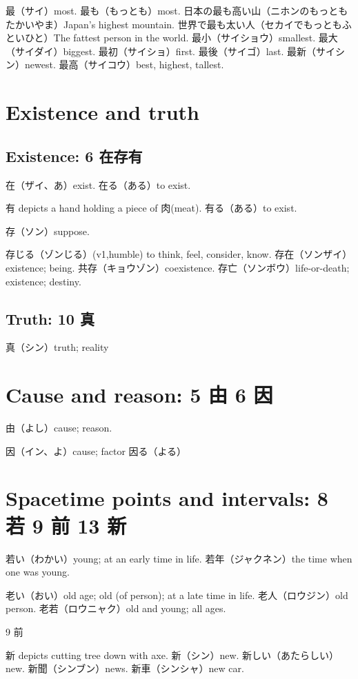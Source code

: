 最（サイ）most.
最も（もっとも）most.
日本の最も高い山（ニホンのもっともたかいやま）Japan's highest mountain.
世界で最も太い人（セカイでもっともふといひと）The fattest person in the world.
最小（サイショウ）smallest.
最大（サイダイ）biggest.
最初（サイショ）first.
最後（サイゴ）last.
最新（サイシン）newest.
最高（サイコウ）best, highest, tallest.

\section{Existence and truth}

\subsection{Existence: 6 在存有}

在（ザイ、あ）exist.
在る（ある）to exist.

有 depicts a hand holding a piece of 肉(meat).
有る（ある）to exist.

存（ソン）suppose.

存じる（ゾンじる）(v1,humble) to think, feel, consider, know.
存在（ソンザイ）existence; being.
共存（キョウゾン）coexistence.
存亡（ソンボウ）life-or-death; existence; destiny.

\subsection{Truth: 10 真}

真（シン）truth; reality

\section{Cause and reason: 5 由 6 因}

由（よし）cause; reason.

因（イン、よ）cause; factor
因る（よる）

\section{Spacetime points and intervals: 8 若 9 前 13 新}

若い（わかい）young; at an early time in life.
若年（ジャクネン）the time when one was young.

老い（おい）old age; old (of person); at a late time in life.
老人（ロウジン）old person.
老若（ロウニャク）old and young; all ages.

9 前

新 depicts cutting tree down with axe.
新（シン）new.
新しい（あたらしい）new.
新聞（シンブン）news.
新車（シンシャ）new car.
